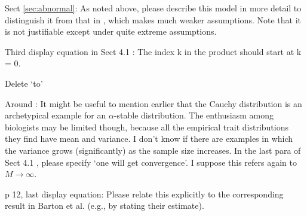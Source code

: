 
\begin{point}{}
Sect \ref{sec:abnormal}: As noted above, please describe this model in more detail to distinguish it
from that in \citet{barton2017infinitesimal}, which makes much weaker assumptions. Note that it is
not justifiable except under quite extreme assumptions.
\end{point}


\begin{point}{\revref}
Third display equation in Sect 4.1 \revref: The index k in the product should start at k = 0.
\end{point}


\begin{point}{\revref}
Delete ‘to’
\end{point}


\begin{point}{}
Around : It might be useful to mention earlier that the Cauchy distribution is an archetypical
example for an $\alpha$-stable distribution. The enthusiasm among biologists may be limited
though, because all the empirical trait distributions they find have mean and variance. I
don’t know if there are examples in which the variance grows (significantly) as the sample
size increases. In the last para of Sect 4.1 \revref, please specify ‘one will get convergence’. I
suppose this refers again to $M \to \infty$.
\end{point}


\begin{point}{\revref}
p 12, last display equation: Please relate this explicitly to the corresponding result in
Barton et al. (e.g., by stating their estimate).
\end{point}


